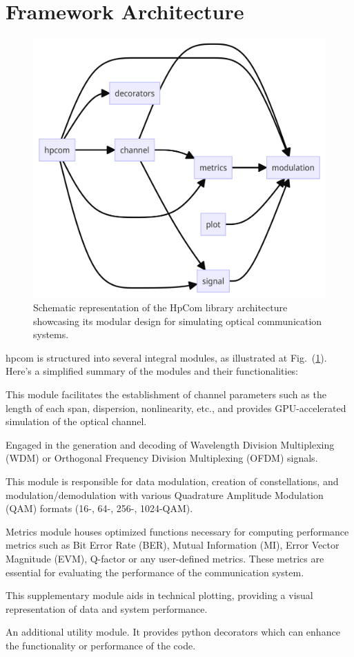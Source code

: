 \section{Framework Architecture}

\begin{figure}[t]
   \centering
        \includegraphics[width=0.7\linewidth]{images/hpcom/hpcom_sctructure.png}
    \caption{Schematic representation of the HpCom library architecture showcasing its modular design for simulating optical communication systems.}
    \label{fig:hpcom_arch}
\end{figure}

\Gls{hpcom} is structured into several integral modules, as illustrated at Fig.~(\ref{fig:hpcom_arch}). Here's a simplified summary of the modules and their functionalities:

\begin{description}[style=multiline, leftmargin=2.5cm, font=\normalfont]
    \item[\texttt{channel}] This module facilitates the establishment of channel parameters such as the length of each span, dispersion, nonlinearity, etc., and provides GPU-accelerated simulation of the optical channel.
    \item[\texttt{signal}] Engaged in the generation and decoding of Wavelength Division Multiplexing (WDM) or Orthogonal Frequency Division Multiplexing (OFDM) signals.
    \item[\texttt{modulation}] This module is responsible for data modulation, creation of constellations, and modulation/demodulation with various Quadrature Amplitude Modulation (QAM) formats (16-, 64-, 256-, 1024-QAM).
    \item[\texttt{metrics}] Metrics module houses optimized functions necessary for computing performance metrics such as Bit Error Rate (BER), Mutual Information (MI), Error Vector Magnitude (EVM), Q-factor or any user-defined metrics. These metrics are essential for evaluating the performance of the communication system.
    \item[\texttt{plot}] This supplementary module aids in technical plotting, providing a visual representation of data and system performance.
    \item[\texttt{decorators}] An additional utility module. It provides python decorators which can enhance the functionality or performance of the code.
\end{description}

